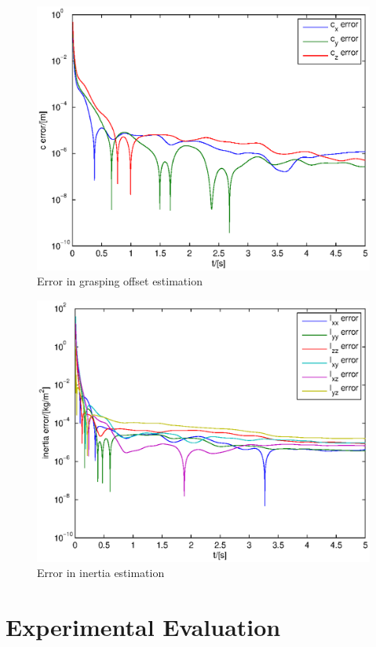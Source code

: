 \begin{figure}
	\centering
	\includegraphics[scale=.7]{figures/grasping_offset_error.eps}
	\caption{Error in grasping offset estimation}
	\label{fig:grasping_offset_error}
\end{figure}

\begin{figure}
	\centering
	\includegraphics[scale=.7]{figures/inertia_error.eps}
	\caption{Error in inertia estimation}
	\label{fig:inertia_error}
\end{figure}

\chapter{Experimental Evaluation}
\label{chap:experimental_evaluation}

